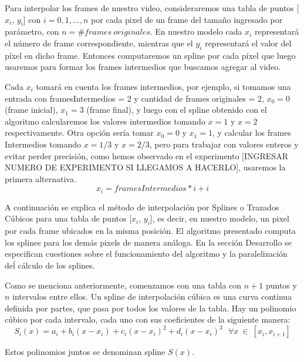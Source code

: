 
\par Para interpolar los frames de nuestro video, consideraremos una tabla de puntos [$x_i$, $y_i$] con $i=0,1,...,n$ por cada pixel de un frame del tamaño ingresado por parámetro, con $n=\#frames\ originales$. En nuestro modelo cada $x_{i}$ representará el número de frame correspondiente, mientras que el $y_{i}$ representará el valor del píxel en dicho frame. Entonces computaremos un spline por cada píxel que luego usaremos para formar los frames intermedios que buscamos agregar al video.

\par Cada $x_i$ tomará en cuenta los frames intermedios, por ejemplo, si tomamos una entrada con framesIntermedios = 2 y cantidad de frames originales = 2, $x_0=0$(frame inicial), $x_1=3$ (frame final), y luego con el spline obtenido con el algoritmo calcularemos los valores intermedios tomando $x=1$ y $x=2$ respectivamente. Otra opción sería tomar $x_0=0$ y $x_1=1$, y calcular los frames Intermedios tomando $x=1/3$ y $x=2/3$, pero para trabajar con valores enteros y evitar perder precisión, como hemos observado en el experimento [INGRESAR NUMERO DE EXPERIMENTO SI LLEGAMOS A HACERLO], usaremos la primera alternativa. 
\begin{equation*}\label{calculo de xi}
x_i = framesIntermedios * i + i
\end{equation*}
\par A continuación se explica el método de interpolación por Splines o Trazados Cúbicos para una tabla de puntos [$x_i$, $y_i$], es decir, en nuestro modelo, un pixel por cada frame ubicados en la misma posición. El algoritmo presentado computa los splines para los demás pixels de manera análoga. En la sección Desarrollo se especifican cuestiones sobre el funcionamiento del algoritmo y la paralelización deĺ cálculo de los splines.
\par Como se menciona anteriormente, comenzamos con una tabla con $n+1$ puntos y $n$ intervalos entre ellos. Un spline de interpolación cúbica es una curva continua definida por partes, que pasa por todos los valores de la tabla. Hay un polinomio cúbico por cada intervalo, cada uno con sus coeficientes de la siguiente manera:
\begin{equation*}\label{splines}
S_i(x) = a_i + b_i(x-x_i) + c_i(x-x_i)^2 + d_i(x-x_i)^3 \ \ \ \forall x\ \in\ [x_i, x_{i+1}]
\end{equation*}
\par Estos polinomios juntos se denominan spline $S(x)$.
